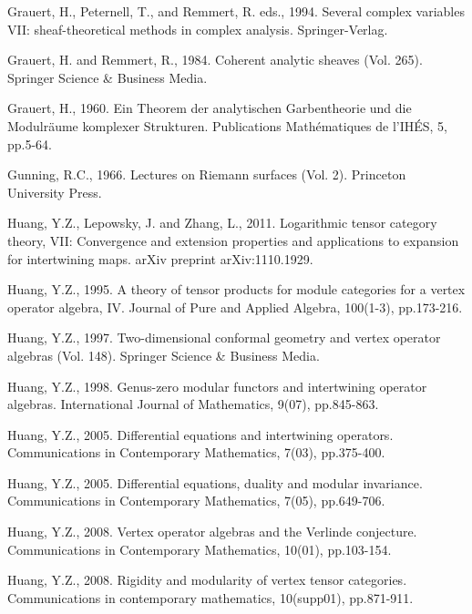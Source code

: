 \documentclass[12pt,a4paper,notitlepage]{article}
\theoremstyle{definition}
\theoremstyle{plain}
\numberwithin{equation}{section}
\begin{document}
\begin{thebibliography}{999999}
		
		
		Grauert, H., Peternell, T., and Remmert, R. eds., 1994. Several complex variables VII: sheaf-theoretical methods in complex analysis. Springer-Verlag.
		
		Grauert, H. and Remmert, R., 1984. Coherent analytic sheaves (Vol. 265). Springer Science \& Business Media.
		
		Grauert, H., 1960. Ein Theorem der analytischen Garbentheorie und die Modulr\"aume komplexer Strukturen. Publications Math\'ematiques de l'IH\'ES, 5, pp.5-64.
		
Gunning, R.C., 1966. Lectures on Riemann surfaces (Vol. 2). Princeton University Press.

Huang, Y.Z., Lepowsky, J. and Zhang, L., 2011. Logarithmic tensor category theory, VII: Convergence and extension properties and applications to expansion for intertwining maps. arXiv preprint arXiv:1110.1929.
	
Huang, Y.Z., 1995. A theory of tensor products for module categories for a vertex operator algebra, IV. Journal of Pure and Applied Algebra, 100(1-3), pp.173-216.	

		
		Huang, Y.Z., 1997. Two-dimensional conformal geometry and vertex operator algebras (Vol. 148). Springer Science \& Business Media.
		

Huang, Y.Z., 1998. Genus-zero modular functors and intertwining operator algebras. International Journal of Mathematics, 9(07), pp.845-863.		
		
Huang, Y.Z., 2005. Differential equations and intertwining operators. Communications in Contemporary Mathematics, 7(03), pp.375-400.

Huang, Y.Z., 2005. Differential equations, duality and modular invariance. Communications in Contemporary Mathematics, 7(05), pp.649-706.

Huang, Y.Z., 2008. Vertex operator algebras and the Verlinde conjecture. Communications in Contemporary Mathematics, 10(01), pp.103-154.

Huang, Y.Z., 2008. Rigidity and modularity of vertex tensor categories. Communications in contemporary mathematics, 10(supp01), pp.871-911.


\end{thebibliography}
\end{document}
